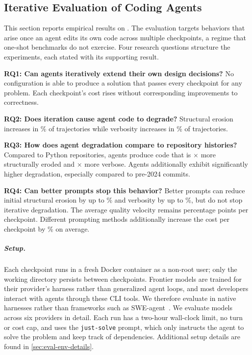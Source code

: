 \subsection{Iterative Evaluation of Coding Agents}\label{sec:results}

This section reports empirical results on \scb{}. The evaluation targets
behaviors that arise once an agent edits its own code across multiple
checkpoints, a regime that one-shot benchmarks do not exercise. Four
research questions structure the experiments, each stated with its
supporting result.

\noindent\textbf{RQ1: Can agents iteratively extend their own design decisions?} No configuration is able to produce a solution that passes every checkpoint for any problem. Each checkpoint's cost rises without corresponding improvements to correctness.

\noindent\textbf{RQ2: Does iteration cause agent code to degrade?} Structural erosion increases in \erosionPctIncreasing\% of trajectories while verbosity increases in \vfTrajIncPct\% of trajectories.

\noindent\textbf{RQ3: How does agent degradation compare to repository histories?} Compared to \avhPanelN{} Python repositories, agents produce code that is \avhAllErosionRatio{}$\times$ more structurally eroded and \avhAllVerbRatio{}$\times$ more verbose. Agents additionally exhibit significantly higher degradation, especially compared to pre-2024 commits.

\noindent\textbf{RQ4: Can better prompts stop this behavior?} Better prompts can reduce initial structural erosion by up to \psRqInitialEroReductionMax\% and verbosity by up to \psRqInitialVerbReductionMax\%, but do not stop iterative degradation. The average quality velocity remains \psRqQualityVelocityPp{} percentage points per checkpoint. Different prompting methods additionally increase the cost per checkpoint by \psRqCostIncreaseMean\% on average.


\subparagraph{Setup.} 

Each checkpoint runs in a fresh Docker container as a non-root user; only the working directory persists between checkpoints. Frontier models are trained for their provider's harness rather than generalized agent loops, and most developers interact with agents through these CLI tools. We therefore evaluate in native harnesses rather than frameworks such as SWE-agent~\citep{swe-agent}. We evaluate \overallNumModels{} models across six providers in detail. Each run has a two-hour wall-clock limit, no turn or cost cap, and uses the \texttt{just-solve} prompt, which only instructs the agent to solve the problem and keep track of dependencies. Additional setup details are found in \autoref{sec:eval-env-details}.

